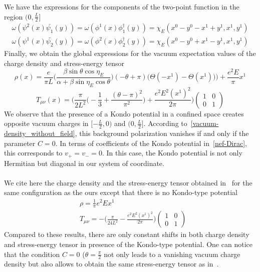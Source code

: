We have the expressions for the components of the two-point function in the region $(0, \frac{L}{2}]$
\begin{equation*}
\begin{split}
\omega(\psi^2(x) \bar{\psi_1}(y)) = 
\omega(\phi^1(x) \phi^\dagger_1(y)) = \chi_E(x^0 - y^0 - x^1 + y^1, x^1, y^1) \\
 \omega(\psi^1(x) \bar{\psi_2}(y)) = 
\omega(\phi^2(x) \phi^\dagger_2(y)) = \chi_E(x^0 - y^0 + x^1 - y^1, x^1, y^1)
\end{split}
\end{equation*}
Finally, we obtain the global expressions for the vacuum expectation values of the charge density and stress-energy tensor 
\begin{equation}\label{vacuum-rho-with-field}
\rho(x) = \frac{e}{\pi L}\Big( \frac{\beta \sin \theta \cos \eta_E}{\alpha + \beta \sin \eta_E \cos \theta}\Big) (-\theta + \pi)
\Big(\Theta(- x^1) - \Theta(x^1))\Big) + \frac{e^2 E}{\pi} x^1
\end{equation}
\begin{equation}\label{vacuum-T-with-field}
T_{\mu\nu}(x) = 
\bigg( \frac{\pi}{2L^2}\big( -\frac{1}{3} + \frac{(\theta - \pi)^2}{\pi^2}\big) + \frac{e^2E^2(x^1)^2}{2 \pi} \bigg)
\begin{pmatrix}
1 & 0 \\ 0 & 1
\end{pmatrix}
\end{equation}
%
We observe that the presence of a Kondo potential in a confined space creates opposite vacuum charges in $[-\frac L 2, 0)$ and $(0, \frac L 2]$.
According to~\cref{vacuum-density_without_field}, 
this background polarization vanishes if and only if the parameter $C = 0$. 
In terms of coefficients of the Kondo potential in~\cref{nef-Dirac},
this corresponds to $v_+ = v_- = 0$.
In this case, the Kondo potential is not only Hermitian but diagonal in our system of coordinate. \\\\
%
We cite here the charge density and the stress-energy tensor obtained in~\cite{Zahn2015} for the same configuration as the ours except that there is no Kondo-type potential
\begin{equation*}
\begin{split}
& \rho = \frac 1 \pi e^2 Ex^1 \\
& T_{\mu\nu} = - \big( \frac{\pi}{24L^2} - \frac{e^2 E^2 (x^1)^2}{2\pi}\big) \begin{pmatrix} 1 & 0 \\ 0 & 1 \end{pmatrix}
\end{split}
\end{equation*}
Compared to these results,
there are only constant shifts in both charge density and stress-energy tensor in presence of the Kondo-type potential.
One can notice that the condition $C = 0$ ($\theta = \frac \pi 2$ not only leads to a vanishing vacuum charge density but also allows to obtain the same stress-energy tensor as in~\cite{Zahn2015}.
